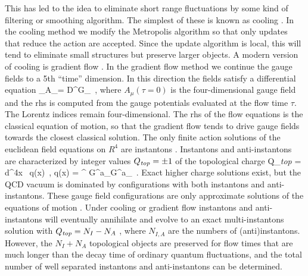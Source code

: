  This has led to the idea to eliminate short range fluctuations by 
some kind of filtering or smoothing algorithm. The simplest of these is
known as cooling \cite{Teper:1985ek}. In the cooling method we modify
the Metropolis algorithm so that only updates that reduce the action
are accepted. Since the update algorithm is local, this will tend to
eliminate small structures but preserve larger objects. A modern version
of cooling is gradient flow \cite{Luscher:2010iy}. In the gradient 
flow method we continue the gauge fields to a 5th ``time'' dimension. In 
this direction the fields satisfy a differential equation
\be 
\label{grad_flow} 
 \partial_\tau A_\mu = D^\nu G_{\mu\nu}\, ,
\ee
where $A_\mu(\tau=0)$ is the four-dimensional gauge field and the rhs
is computed from the gauge potentials evaluated at the flow time $\tau$.
The Lorentz indices remain four-dimensional. The rhs of the flow equations
is the classical equation of motion, so that the gradient flow tends to
drive gauge fields towards the closest classical solution. The only 
finite action solutions of the euclidean field equations on $R^4$ are
instantons \cite{Belavin:1975fg,Schafer:1996wv}. Instantons and 
anti-instantons are characterized by integer values $Q_{\it top}=\pm 1$
of the topological charge 
\be 
\label{q_top}
 Q_{\it top} = \int d^4x \, q(x)\, , \hspace{0.5cm}
 q(x) =  \epsilon^{\mu\nu\alpha\beta}
        G^a_{\mu\nu}G^a_{\alpha\beta}\, . 
\ee
Exact higher charge solutions exist, but the QCD vacuum is dominated
by configurations with both instantons and anti-instantons. These
gauge field configurations are only approximate solutions of the equations 
of motion \cite{Schafer:1996wv}. Under cooling or gradient flow instantons 
and anti-instantons will eventually annihilate and evolve to an exact 
multi-instantons solution with $Q_{\it top}=N_I-N_A$ , where $N_{I,A}$ are 
the numbers of (anti)instantons. However, the $N_I+N_A$ topological objects 
are preserved for flow times that are much longer than the decay time of 
ordinary quantum fluctuations, and the total number of well separated 
instantons and anti-instantons can be determined. 

